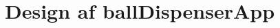 \documentclass[Softwaredesign/Softwaredesign_main.tex]{subfiles}
\begin{document}
\section{Design af ballDispenserApp}



\end{document}

